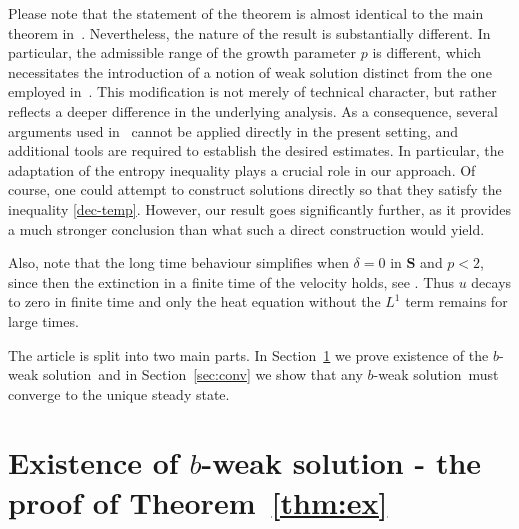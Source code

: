 \documentclass[11pt, a4paper, reqno]{amsart}
\numberwithin{equation}{section}
\renewcommand{\S}{\mathbf{S}}
\newcommand{\bb}{b}
\newcommand{\blafnc}{correction function}
\newcommand{\bws}{$\bb$-weak solution}
\begin{document}
Please note that the statement of the theorem is almost identical to the main theorem in~\cite{AbBuKa2024}.  
Nevertheless, the nature of the result is substantially different. In particular, the admissible range of the growth parameter $p$ is different, which necessitates the introduction of a notion of weak solution distinct from the one employed in~\cite{AbBuKa2024}.  
This modification is not merely of technical character, but rather reflects a deeper difference in the underlying analysis.  
As a consequence, several arguments used in~\cite{AbBuKa2024} cannot be applied directly in the present setting, and additional tools are required to establish the desired estimates.  
In particular, the adaptation of the entropy inequality plays a crucial role in our approach.  
Of course, one could attempt to construct solutions directly so that they satisfy the inequality \eqref{dec-temp}. However, our result goes significantly further, as it provides a much stronger conclusion than what such a direct construction would yield.

Also, note that the long time behaviour simplifies when $\delta=0$ in $\S$ and $p<2$, since then the extinction in a finite time of the velocity holds, see \cite{A21}. Thus $u$ decays to zero in finite time and  only the heat equation without the $L^1$ term remains for large times.


The article is split into two main parts. In Section~\ref{sec:ex} we prove existence of the \bws\ and in Section~\ref{sec:conv} we show that any \bws\ must converge to the unique steady state.




 
\section{Existence of \texorpdfstring{\bws}{b} - the proof of Theorem~\ref{thm:ex}}
\label{sec:ex}
\end{document}
